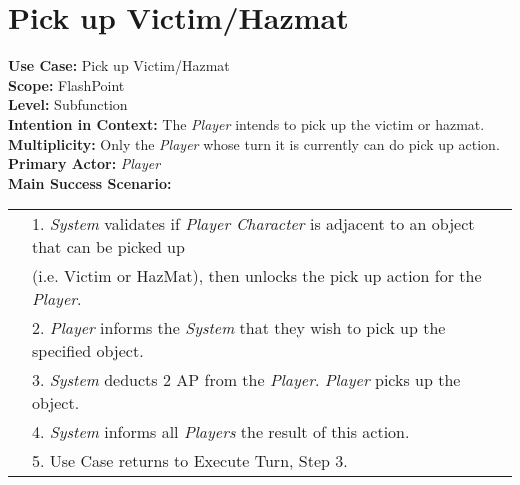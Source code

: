 \documentclass{article}
\begin{document}
	\section*{Pick up Victim/Hazmat}
	\textbf{Use Case:} Pick up Victim/Hazmat\\
	\textbf{Scope:} FlashPoint\\
	\textbf{Level:} Subfunction\\
	\textbf{Intention in Context:} The \textit{Player} intends to pick up the victim or hazmat.\\
	\textbf{Multiplicity:} Only the \textit{Player} whose turn it is currently can do pick up action.\\
	\textbf{Primary Actor:} \textit{Player}\\
	\textbf{Main Success Scenario:}\\
	\begin{tabular}{l l}
		&1. \textit{System} validates if \textit{Player Character} is adjacent to an object that can be picked up\\
		&\qquad(i.e. Victim or HazMat), then unlocks the pick up action for the \textit{Player}.\\
		&2. \textit{Player} informs the \textit{System} that they wish to pick up the specified object.\\
		&3. \textit{System} deducts 2 AP from the \textit{Player}. \textit{Player} picks up the object.\\
		&4. \textit{System} informs all \textit{Players} the result of this action.\\
		&5. Use Case returns to Execute Turn, Step 3.
	\end{tabular}
\end{document}

